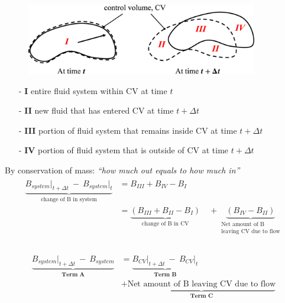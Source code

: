 \documentclass[12pt, a4paper]{article}
\begin{document}
\begin{tcolorbox}[breakable, title = Derivation]
\begin{figure}[H]
    \centering
    \includegraphics[width = 0.9\textwidth]{img/control_volume.eps}
\end{figure}

\begin{itemize}
    \item[-] \textbf{I}  entire fluid system within CV at time $t$
    \item[-] \textbf{II} new fluid that has entered CV at time $t + \Delta t$
    \item[-] \textbf{III} portion of fluid system that remains inside CV at time $t + \Delta t$
    \item[-] \textbf{IV} portion of fluid system that is outside of CV at time $t + \Delta t$
\end{itemize}

By conservation of mass: \textit{``how much out equals to how much in''}
\begin{align*}
\begin{split}
    \underbrace{B_{system} \lvert_{t + \Delta t}  \ -\  B_{system} \lvert_{t}}_{\text{change of B in system}} & = B_{III}+B_{IV}-B_{I}\\
    & = \underbrace{(B_{III}+B_{II}-B_{I})}_{\text{change of B in CV}}\quad +\underbrace{(B_{IV}-B_{II})}_{\substack{\text{Net amount of B} \\ \text{leaving CV due to flow}}}\\
\end{split}
\end{align*}

\begin{align*}
\begin{split}
    \underbrace{B_{system} \lvert_{t + \Delta t} \ -\ B_{system}}_{\textbf{Term A}} 
    &= \underbrace{B_{CV} \lvert_{t + \Delta t} \ -\  B_{CV}  \lvert_{t}}_{\textbf{Term B}}\\
    & + \underbrace{\text{Net amount of B leaving CV due to flow}}_{\textbf{Term C}}
\end{split}
\end{align*}


\end{tcolorbox}
\end{document}
